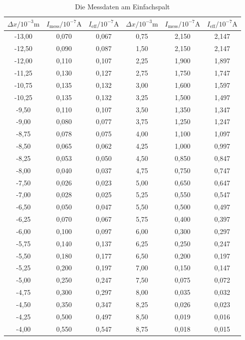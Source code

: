 \begin{table}[H]
    \centering
    \caption{Die Messdaten am Einfachspalt}
    \label{tab:1}
	\begin{tabular}{| c | c |c||c|c|c| }
		\toprule
		{$\Delta x/10^{-3}\si{\metre}$} & {$I_{\text{mess}}/10^{-7}\si{\ampere}$} & {$I_{\text{eff}}/10^{-7}\si{\ampere}$} &{$\Delta x/10^{-3}\si{\metre}$} & {$I_{\text{mess}}/10^{-7}\si{\ampere}$} & {$I_{\text{eff}}/10^{-7}\si{\ampere}$} \\
		\midrule
		-13,00	&0,070	&0,067	&0,75	&2,150	&2,147\\
		-12,50	&0,090	&0,087	&1,50	&2,150	&2,147\\
		-12,00	&0,110	&0,107	&2,25	&1,900	&1,897\\
		-11,25	&0,130	&0,127	&2,75	&1,750	&1,747\\
		-10,75	&0,135	&0,132	&3,00	&1,600	&1,597\\
		-10,25	&0,135	&0,132	&3,25	&1,500	&1,497\\
		-9,50 	&0,110	&0,107	&3,50	&1,350	&1,347\\
		-9,00 	&0,080	&0,077	&3,75	&1,250	&1,247\\
		-8,75 	&0,078	&0,075	&4,00	&1,100	&1,097\\
		-8,50 	&0,065	&0,062	&4,25	&1,000	&0,997\\
		-8,25 	&0,053	&0,050	&4,50	&0,850	&0,847\\
		-8,00 	&0,040	&0,037	&4,75	&0,750	&0,747\\
		-7,50 	&0,026	&0,023	&5,00	&0,650	&0,647\\
		-7,00 	&0,028	&0,025	&5,25	&0,550	&0,547\\
		-6,50 	&0,050	&0,047	&5,50	&0,500	&0,497\\
		-6,25 	&0,070	&0,067	&5,75	&0,400	&0,397\\
		-6,00 	&0,100	&0,097	&6,00	&0,300	&0,297\\
		-5,75 	&0,140	&0,137	&6,25	&0,250	&0,247\\
		-5,50 	&0,180	&0,177	&6,50	&0,200	&0,197\\
		-5,25 	&0,200	&0,197	&7,00	&0,150	&0,147\\
		-5,00 	&0,250	&0,247	&7,50	&0,075	&0,072\\
		-4,75 	&0,300	&0,297	&8,00	&0,035	&0,032\\
		-4,50 	&0,350	&0,347	&8,25	&0,026	&0,023\\
		-4,25 	&0,500	&0,497	&8,50	&0,019	&0,016\\
		-4,00 	&0,550	&0,547	&8,75	&0,018	&0,015\\

\end{tabular}
\end{table}
